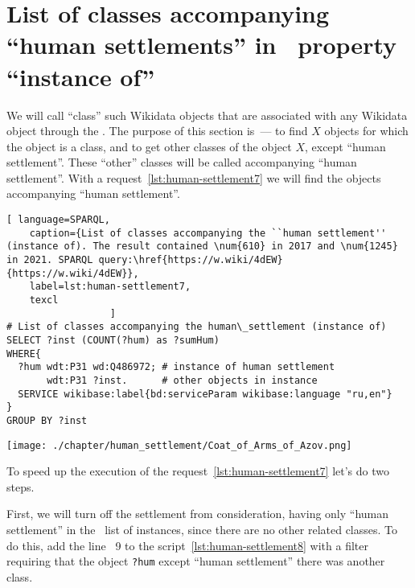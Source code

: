 \section{List of classes accompanying ``human settlements'' in ~property ``instance of''}
\label{human-settlement:tag1}

We will call ``class'' such Wikidata objects
that are associated with any Wikidata object through the .
The purpose of this section is~--- to find $X$ objects
for which the object  is a class,
and to get other classes of the object $X$, except ``human settlement''.
These ``other'' classes will be called accompanying ``human settlement''.
With a request~\ref{lst:human-settlement7}
we will find the objects accompanying ``human settlement''.

\begin{lstlisting}[ language=SPARQL,
    caption={List of classes accompanying the ``human settlement''  (instance of). The result contained \num{610} in 2017 and \num{1245} in 2021. SPARQL query:\href{https://w.wiki/4dEW}{https://w.wiki/4dEW}}, 
    label=lst:human-settlement7,
    texcl 
                  ]
# List of classes accompanying the human\_settlement (instance of)
SELECT ?inst (COUNT(?hum) as ?sumHum) 
WHERE{          
  ?hum wdt:P31 wd:Q486972; # instance of human settlement
       wdt:P31 ?inst.      # other objects in instance
  SERVICE wikibase:label{bd:serviceParam wikibase:language "ru,en"}
}  
GROUP BY ?inst
\end{lstlisting}%

\begin{marginfigure} [0.0 cm]
{\texttt{[image: ./chapter/human\_settlement/Coat\_of\_Arms\_of\_Azov.png]}}
    \caption {The coat of arms of the ``human settlement''  of which country is depicted? \newline%
See~\protect\ref{answer:flag_human_settlements} on page~\protect\pageref{answer:flag_human_settlements}.}
    \label {fig:flag_question_human_settlements5}%
\end{marginfigure}

To speed up the execution of the request~\ref{lst:human-settlement7} let's do two steps.

First, we will turn off the settlement from consideration, 
having only ``human settlement'' in the ~list of instances,
since there are no other related classes. 
To do this, add the line ~\num{9} to the script~\ref{lst:human-settlement8} with a filter
requiring that the object \lstinline|?hum| 
except  ``human settlement'' there was another class.

